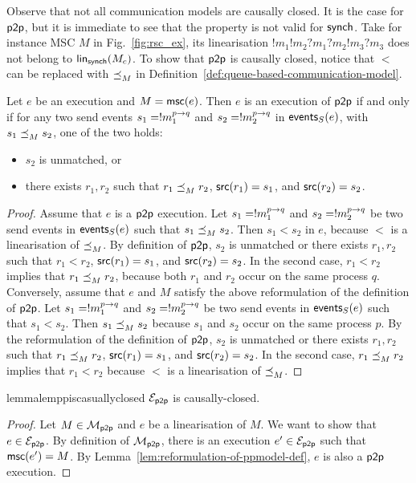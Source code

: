 Observe that not all communication models are causally closed. It is the case for $\ppmodel$,  but it is immediate  to see that the property is not valid  for $\synchmodel$. Take for instance  MSC $M$ in Fig.~\ref{fig:rsc_ex},  its linearisation 
$!m_1!m_2?m_1?m_2!m_3?m_3$ 
  does not belong to $\linearisationsof{M_c}{\synchmodel}$.  To show that $\ppmodel$ is causally closed, 
notice that $<$ can be replaced with $\porderof{M}$ in  Definition~\ref{def:queue-based-communication-model}.
\begin{lemma}\label{lem:reformulation-of-ppmodel-def}
    Let $e$ be an execution and  $M=\mscof{e}$.
    Then $e$ is an execution of $\ppmodel$ if and only if
    for any two send events $s_1=\send{p}{q}{\msg_1}$ and $s_2=\send{p}{q}{\msg_2}$ in $\sendeventsof{e}$, with $s_1 \porderof{M} s_2$,
        one of the two holds:
        \begin{itemize}
            \item $s_2$ is unmatched, or
            \item there exists $r_1,r_2$ such that $r_1 \porderof{M} r_2$, $\source(r_1)=s_1$, and $\source(r_2)=s_2$.
        \end{itemize}
\end{lemma}
\begin{proof}
    Assume that $e$ is a $\ppmodel$ execution.
    Let $s_1=\send{p}{q}{\msg_1}$ and $s_2=\send{p}{q}{\msg_2}$ be two send events in $\sendeventsof{e}$ such that $s_1 \porderof{M} s_2$.
    Then $s_1<s_2$ in $e$, because $<$ is a linearisation of $\porderof{M}$.
    By  definition of $\ppmodel$, $s_2$ is unmatched or there exists $r_1,r_2$ such that $r_1 < r_2$, $\source(r_1)=s_1$, and $\source(r_2)=s_2$.
    In the second case, $r_1 < r_2$ implies that
    $r_1 \porderof{M} r_2$, because both $r_1$ and $r_2$ occur on the same process $q$.
    Conversely, assume that $e$ and $M$ satisfy the above reformulation of the definition of $\ppmodel$. 
    Let $s_1=\send{p}{q}{\msg_1}$ and $s_2=\send{p}{q}{\msg_2}$ be two send events in $\sendeventsof{e}$ such that $s_1 < s_2$.
    Then $s_1 \porderof{M} s_2$
    because $s_1$ and $s_2$ occur on the same process $p$.
    By the reformulation of the definition of $\ppmodel$, $s_2$ is unmatched or there exists $r_1,r_2$ such that $r_1 \porderof{M} r_2$, $\source(r_1)=s_1$, and $\source(r_2)=s_2$.
    In the second case, $r_1 \porderof{M} r_2$
    implies that $r_1 < r_2$ because $<$ is a  linearisation of $\porderof{M}$.
\end{proof}

\begin{restatable}[]{lemma}{lemppiscasuallyclosed}\label{lem:pp-is-causally-closed}
	$\executionsofmodel{\ppmodel}$ is causally-closed.
\end{restatable}
\begin{proof}
    Let $M\in\mscsetofmodel{\ppmodel}$ 
    and  $e$ be a linearisation of $M$.
    We want to show that $e\in\executionsofmodel{\ppmodel}$.
    By definition of $\mscsetofmodel{\ppmodel}$, 
    there is an execution 
    $e'\in\executionsofmodel{\ppmodel}$
    such that $\mscof{e'}=M$.
    By Lemma~\ref{lem:reformulation-of-ppmodel-def},
    $e$ is also a $\ppmodel$ execution.
\end{proof}